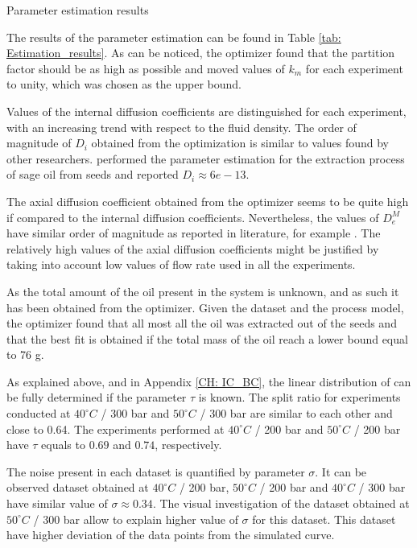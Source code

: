 \documentclass[../Article_Model_Parameters.tex]{subfiles}
\begin{document}
	\begin{table}[!h]
		\centering
		\caption{Parameter estimation results}
		\label{tab: Estimation_results}
	\end{table}

	The results of the parameter estimation can be found in Table \ref{tab: Estimation_results}. As can be noticed, the optimizer found that the partition factor should be as high as possible and moved values of $k_m$ for each experiment to unity, which was chosen as the upper bound.
		
	Values of the internal diffusion coefficients are distinguished for each experiment, with an increasing trend with respect to the fluid density. The order of magnitude of $D_i$ obtained from the optimization is similar to values found by other researchers. \citet{Reverchon1996} performed the parameter estimation for the extraction process of sage oil from seeds and reported $D_i \approx 6e-13$.
	
	The axial diffusion coefficient obtained from the optimizer seems to be quite high if compared to the internal diffusion coefficients. Nevertheless, the values of $D_e^M$ have similar order of magnitude as reported in literature, for example \citet{ReisVasco2000}. The relatively high values of the axial diffusion coefficients might be justified by taking into account low values of flow rate used in all the experiments.
	
	As the total amount of the oil present in the system is unknown, and as such it has been obtained from the optimizer. Given the dataset and the process model, the optimizer found that all most all the oil was extracted out of the seeds and that the best fit is obtained if the total mass of the oil reach a lower bound equal to 76 g.
	
	As explained above, and in Appendix \ref{CH: IC_BC}, the linear distribution of can be fully determined if the parameter $\tau$ is known. The split ratio for experiments conducted at $40 ^\circ C$ / 300 bar and $50 ^\circ C$ / 300 bar are similar to each other and close to 0.64. The experiments performed at $40 ^\circ C$ / 200 bar and $50 ^\circ C$ / 200 bar have $\tau$ equals to $0.69$ and $0.74$, respectively. 
	
	The noise present in each dataset is quantified by parameter $\sigma$. It can be observed dataset obtained at $40 ^\circ C$ / 200 bar, $50 ^\circ C$ / 200 bar and $40 ^\circ C$ / 300 bar have similar value of $\sigma\approx0.34$. The visual investigation of the dataset obtained at $50 ^\circ C$ / 300 bar allow to explain higher value of $\sigma$ for this dataset. This dataset have higher deviation of the data points from the simulated curve.
	
\end{document}
